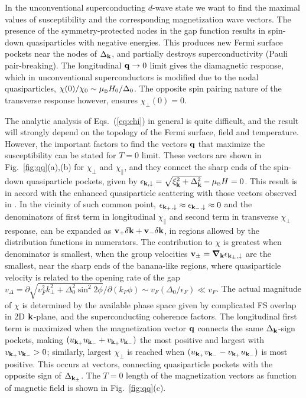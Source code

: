 \documentclass[aps,prl,twocolumn,showpacs,amsmath,amssymb]{revtex4-1}
\begin{document}
In the unconventional superconducting $d$-wave state we want to find the
maximal values of susceptibility and the corresponding 
magnetization wave vectors. 
The presence of the symmetry-protected nodes in the gap function results in 
spin-down quasiparticles with negative energies. This produces new Fermi surface pockets near the nodes 
of $\Delta_{\bf k}$,\cite{kato11_sc_afm} and partially destroys superconductivity (Pauli pair-breaking). 
The longitudinal ${\bf q} \to 0$ limit gives the diamagnetic response, which in unconventional superconductors 
is modified due to the nodal quasiparticles, $\chi(0)/\chi_0 \sim \mu_{\mbox{\tiny B}} H_0/\Delta_0$. The opposite spin pairing nature of the 
transverse response however, ensures $\chi_\perp (0) = 0$.  
 
The analytic analysis of Eqs.~(\ref{eq:chi}) in general is quite difficult, 
and the result will strongly depend 
on the topology of the Fermi surface, field and temperature. 
However, the important factors to find the vectors ${\bf q}$ that maximize the susceptibility 
can be stated for $T=0$ limit. 
These vectors are shown in Fig.~\ref{fig:qq}(a),(b) for $\chi_\perp$ and $\chi_\parallel$,  
and they connect the sharp ends of the spin-down quasiparticle pockets, given by 
$\epsilon_{{\bf k},\downarrow}=\sqrt{\xi_{\bf k}^2 + \Delta_{\bf k}^2}-\mu_{\mbox{\tiny B}} H=0$. 
This result is in accord with the enhanced quasiparticle scattering with those vectors 
observed in \cite{McElroy03_qp_BSCCO}. 
In the vicinity of such common point, 
$\epsilon_{{\bf k}_+,\downarrow} \approx \epsilon_{{\bf k}_-,\downarrow} \approx 0$ and the 
denominators of first term in longitudinal $\chi_\parallel$ 
and second term in transverse $\chi_\perp$ response, can be 
expanded as ${\bf v}_+ \delta{\bf k} + {\bf v}_-\delta{\bf k}$, in regions allowed by the distribution 
functions in numerators. The contribution to $\chi$ is greatest when denominator is smallest, 
when the group velocities ${\bf v}_\pm = \mbox{\boldmath$\nabla$}_{\bf k} \epsilon_{{\bf k}_\pm,\downarrow}$ are the 
smallest, \ie near the sharp ends of the banana-like regions, where quasiparticle 
velocity is related to the opening rate of the gap 
$v_\Delta = \partial \sqrt{v_F^2k_\perp^2 + \Delta_0^2 \sin^2 2\phi} / \partial (k_F \phi)
\sim v_F (\Delta_0/\epsilon_F) \ll v_F$. 
The actual magnitude of $\chi$ is determined by the available phase space given by 
complicated FS overlap in 2D ${\bf k}$-plane, 
and the superconducting coherence factors.  
The longitudinal first term is maximized when 
the magnetization vector ${\bf q}$ connects the same $\Delta_{\bf k}$-sign 
pockets, making 
$ ( u_{{\bf k}_+}u_{{\bf k}_-}+v_{{\bf k}_+}v_{{\bf k}_-} ) $ 
the most positive and largest with $v_{{\bf k}_+}v_{{\bf k}_-}>0$; 
similarly, largest $\chi_\perp$ is reached when $ ( u_{{\bf k}_+}v_{{\bf k}_-}-v_{{\bf k}_+}u_{{\bf k}_-} ) $
is most positive. This occurs at vectors, connecting quasiparticle pockets with the 
opposite sign of $\Delta_{{\bf k}_\pm}$. 
The $T=0$ length of the magnetization vectors as function of magnetic field 
is shown in Fig.~\ref{fig:qq}(c).
\end{document}
